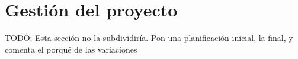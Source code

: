 \chapter{Gestión del proyecto}









TODO: Esta sección no la subdividiría. Pon una planificación inicial, la final, y comenta el porqué de las variaciones


